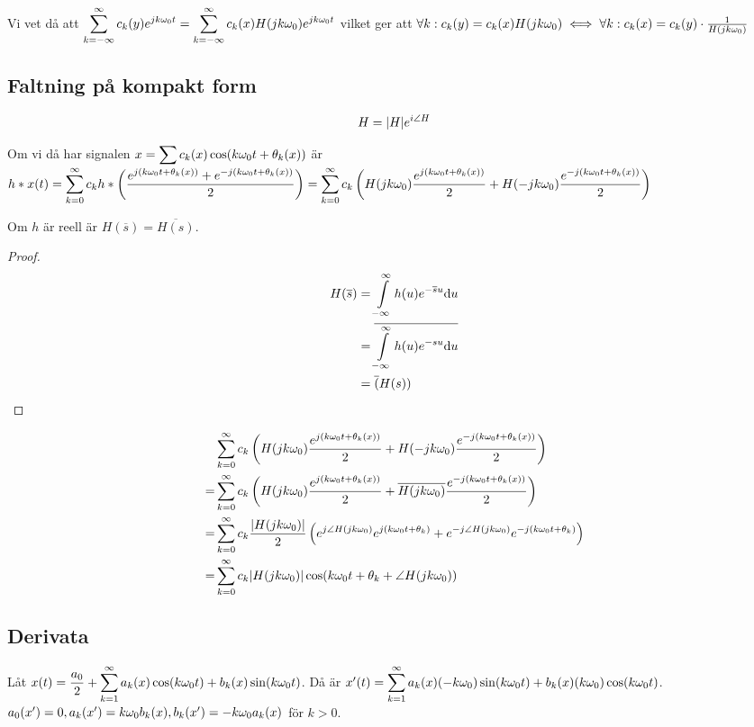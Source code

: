 \documentclass[a4paper]{article}
\begin{document}
Vi vet då att \(
    \displaystyle\sum_{k=-\infty}^\infty c_k(y) e^{jk\omega_0 t} 
    = \displaystyle\sum_{k=-\infty}^\infty c_k(x) H(jk\omega_0)e^{jk\omega_0 t}
\) vilket ger att \(
    \forall k : c_k(y) = c_k(x) H(jk\omega_0) \iff \forall k : c_k(x) = c_k(y) \cdot \frac{1}{H(jk\omega_0)}
\)  

\subsection{Faltning på kompakt form}
\[
    H = \abs{H}e^{i \angle H}
\] 

Om vi då har signalen \(
    x = \displaystyle\sum c_k(x) \cos(k\omega_0 t + \theta_k(x))
\) är \(
    h * x(t) = \displaystyle\sum_{k=0}^\infty c_k h * \left( \displaystyle\frac{e^{j(k\omega_0 t + \theta_k(x))} + e^{-j(k\omega_0 t + \theta_k(x))}}{2}  \right)
    = \displaystyle\sum_{k=0}^\infty c_k\left( H(jk\omega_0) \displaystyle\frac{e^{j(k\omega_0 t + \theta_k(x))}}{2} + H(-jk\omega_0) \displaystyle\frac{e^{-j(k\omega_0 t + \theta_k(x))}}{2}  \right)
\) 

\begin{påst}
    Om \(
        h
    \) är reell är \(
        H(\overline{s}) = \overline{H(s)}
    \).

    \begin{proof}
        \begin{align*}
            H(\overline{s}) &= \displaystyle\int\limits_{-\infty}^\infty h(u) e^{-\overline{s}u} \dd u \\
            &= \overline{ \displaystyle\int\limits_{-\infty}^\infty h(u) e^{-su} \dd u } \\
            &= \overline(H(s))
        \end{align*}
    \end{proof}
\end{påst}
\begin{align*}
    &\displaystyle\sum_{k=0}^\infty c_k\left( H(jk\omega_0) \displaystyle\frac{e^{j(k\omega_0 t + \theta_k(x))}}{2} + H(-jk\omega_0) \displaystyle\frac{e^{-j(k\omega_0 t + \theta_k(x))}}{2}  \right) \\
    = &\displaystyle\sum_{k=0}^\infty c_k\left( H(jk\omega_0) \displaystyle\frac{e^{j(k\omega_0 t + \theta_k(x))}}{2} + \overline{H(jk\omega_0)} \displaystyle\frac{e^{-j(k\omega_0 t + \theta_k(x))}}{2}  \right) \\
    = &\displaystyle\sum_{k=0}^\infty c_k \displaystyle\frac{\abs{H(jk\omega_0)}}{2} \left( e^{j\angle H(jk\omega_0)} e^{j(k\omega_0 t + \theta_k)} + e^{-j\angle H(jk\omega_0)} e^{-j(k\omega_0 t + \theta_k)} \right)  \\
    = &\displaystyle\sum_{k=0}^\infty c_k \abs{H(jk\omega_0)} \cos(k\omega_0 t + \theta_k + \angle H(jk\omega_0))
\end{align*}

\subsection{Derivata}
Låt \(
    x(t) = \displaystyle\frac{a_0}{2} + \displaystyle\sum_{k=1}^\infty a_k(x) \cos(k \omega_0 t) + b_k(x) \sin(k \omega_0 t)
\). Då är \(
    x'(t) = \displaystyle\sum_{k=1}^\infty a_k(x)(-k\omega_0)\sin(k \omega_0 t) + b_k(x) (k\omega_0)\cos(k \omega_0 t)
\). \(
    a_0(x') = 0, a_k(x') = k\omega_0 b_k(x), b_k(x') = -k\omega_0 a_k(x)
\) för \(
    k > 0
\).
\end{document}
